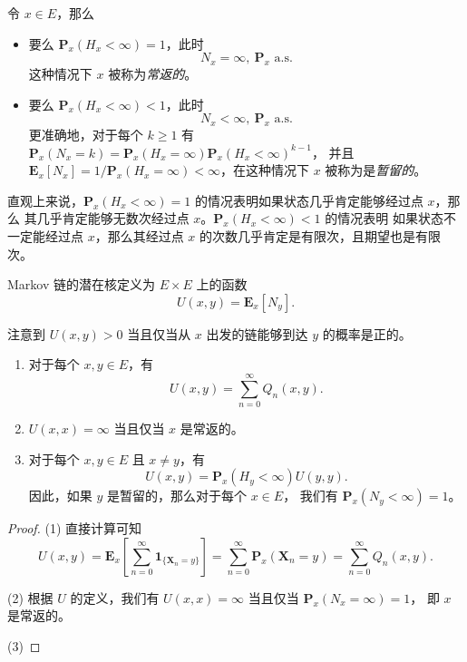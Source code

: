 \documentclass[fontset=none]{Notes}
\newcommand{\mat}[1]{\mathbold{#1}}
\newcommand{\matup}[1]{\mathbf{#1}}
\newcommand{\indicator}[1]{\mathbold 1_{#1}}
\newcommand{\alsu}[1]{\text{$#1$ a.s.}}
\begin{document}
\begin{proposition}\label{prop:recurrent and transient}
  令 $x\in E$，那么
  \begin{itemize}
    \item 要么 $\matup P_x(H_x<\infty)=1$，此时
    \[
      N_x=\infty,\ \alsu{\matup P_x}
    \]
    这种情况下 $x$ 被称为\emph{常返的}。
    \item 要么 $\matup P_x(H_x<\infty)<1$，此时
    \[
      N_x<\infty,\ \alsu{\matup P_x}
    \]
    更准确地，对于每个 $k\geq 1$ 有 $\matup P_x(N_x=k)=\matup P_x(H_x=\infty)\matup P_x(H_x<\infty)^{k-1}$，
    并且 $\matup E_x[N_x]=1/\matup P_x(H_x=\infty)<\infty$，在这种情况下 $x$
    被称为是\emph{暂留的}。
  \end{itemize}
\end{proposition}
\begin{remark}
  直观上来说，$\matup P_x(H_x<\infty)=1$ 的情况表明如果状态几乎肯定能够经过点 $x$，那么
  其几乎肯定能够无数次经过点 $x$。$\matup P_x(H_x<\infty)<1$ 的情况表明
  如果状态不一定能经过点 $x$，那么其经过点 $x$ 的次数几乎肯定是有限次，且期望也是有限次。
\end{remark}

\begin{definition}
  Markov 链的潜在核定义为 $E\times E$ 上的函数 
  \[
    U(x,y)=\matup E_x[N_y].
  \]
\end{definition}

注意到 $U(x,y)>0$ 当且仅当从 $x$ 出发的链能够到达 $y$ 的概率是正的。

\begin{proposition}
  \mbox{}
  \begin{enumerate}
    \item 对于每个 $x,y\in E$，有
    \[
      U(x,y)=\sum_{n=0}^\infty Q_n(x,y).  
    \]
    \item $U(x,x)=\infty$ 当且仅当 $x$ 是常返的。
    \item 对于每个 $x,y\in E$ 且 $x\neq y$，有
    \[
      U(x,y)=\matup P_x(H_y<\infty) U(y,y).  
    \]
    因此，如果 $y$ 是暂留的，那么对于每个 $x\in E$，
    我们有 $\matup P_x(N_y<\infty)=1$。
  \end{enumerate}
\end{proposition}
\begin{proof}
  (1) 直接计算可知
  \[
    U(x,y)=\matup E_x\left[
      \sum_{n=0}^\infty \indicator{\{\mat X_n=y\}}
    \right]  =\sum_{n=0}^\infty \matup P_x(\mat X_n=y)
    =\sum_{n=0}^\infty Q_n(x,y).
  \]

  (2) 根据 $U$ 的定义，我们有
  $U(x,x)=\infty$ 当且仅当 $\matup P_x(N_x=\infty)=1$，
  即 $x$ 是常返的。

  (3) 
\end{proof}
\end{document}
